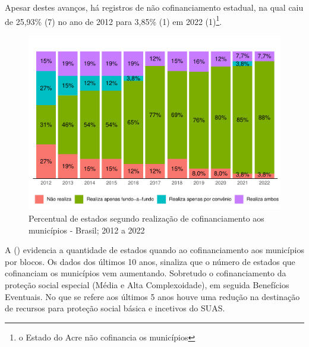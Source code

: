\documentclass[
  brazilian]{report}
\begin{document}
Apesar destes avanços, há registros de não cofinanciamento estadual, na
qual caiu de 25,93\% (7) no ano de 2012 para 3,85\% (1) em 2022
(1)\footnote{o Estado do Acre não cofinancia os municípios}.

\begin{figure}
\includegraphics{Censo-SUAS-2022_files/figure-latex/estados-cofinanciamento-municipios-1} \caption[Percentual de estados segundo realização de cofinanciamento aos municípios - Brasil]{Percentual de estados segundo realização de cofinanciamento aos municípios - Brasil; 2012 a 2022}\label{fig:estados-cofinanciamento-municipios}
\end{figure}

A () evidencia a quantidade de estados
quando ao cofinanciamento aos municípios por blocos. Os dados dos
últimos 10 anos, sinaliza que o número de estados que cofinanciam os
municípios vem aumentando. Sobretudo o cofinanciamento da proteção
social especial (Média e Alta Complexoidade), em seguida Benefícios
Eventuais. No que se refere aos últimos 5 anos houve uma redução na
destinação de recursos para proteção social básica e incetivos do SUAS.
\end{document}
